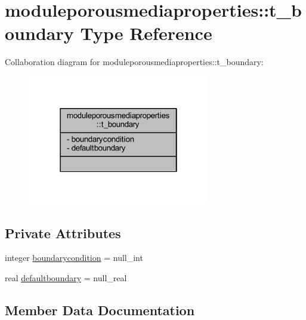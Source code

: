 \hypertarget{structmoduleporousmediaproperties_1_1t__boundary}{}\section{moduleporousmediaproperties\+:\+:t\+\_\+boundary Type Reference}
\label{structmoduleporousmediaproperties_1_1t__boundary}


Collaboration diagram for moduleporousmediaproperties\+:\+:t\+\_\+boundary\+:\nopagebreak
\begin{figure}[H]
\begin{center}
\leavevmode
\includegraphics[width=226pt]{structmoduleporousmediaproperties_1_1t__boundary__coll__graph}
\end{center}
\end{figure}
\subsection*{Private Attributes}
\begin{DoxyCompactItemize}
\item 
integer \mbox{\hyperlink{structmoduleporousmediaproperties_1_1t__boundary_a15ddbfee46baf64668a0f04239f15c0d}{boundarycondition}} = null\+\_\+int
\item 
real \mbox{\hyperlink{structmoduleporousmediaproperties_1_1t__boundary_a35a3d3ec8f7216ca6d5f0e93b53d76dd}{defaultboundary}} = null\+\_\+real
\end{DoxyCompactItemize}


\subsection{Member Data Documentation}
\mbox{\label{structmoduleporousmediaproperties_1_1t__boundary_a15ddbfee46baf64668a0f04239f15c0d}} 
